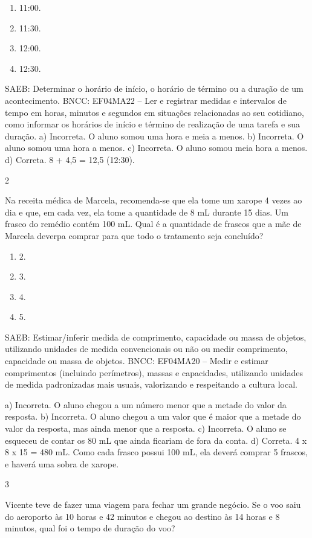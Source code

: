 \begin{mdframed}[linewidth=2pt,linecolor=salmao,roundcorner=2pt]
\begin{itemize}
{\begin{itemize}
\begin{escolha}
\begin{enumerate}
\item
  11:00.
\item
  11:30.
\item
  12:00.
\item
  12:30.
\end{enumerate}

SAEB: Determinar o horário de início, o horário de término ou a duração de um acontecimento.
BNCC: EF04MA22 -- Ler e registrar medidas e intervalos de tempo em horas, minutos e segundos em
situações relacionadas ao seu cotidiano, como informar os horários de início e término de realização
de uma tarefa e sua duração.
a) Incorreta. O aluno somou uma hora e meia a menos.
b) Incorreta. O aluno somou uma hora a menos.
c) Incorreta. O aluno somou meia hora a menos.
d) Correta. 8 + 4,5 = 12,5 (12:30).


\num{2}

Na receita médica de Marcela, recomenda-se que ela tome um xarope 4 vezes ao
dia e que, em cada vez, ela tome a quantidade de 8 mL durante 15 dias. Um
frasco do remédio contém 100 mL. Qual é a quantidade de
frascos que a mãe de Marcela deverpa comprar para que todo o tratamento
seja concluído?

\begin{enumerate}
\item
  2.
\item
  3.
\item
  4.
\item
  5.
\end{enumerate}

SAEB: Estimar/inferir medida de comprimento, capacidade ou massa de objetos, utilizando unidades de medida convencionais ou não ou medir comprimento, capacidade ou massa de objetos.
BNCC: EF04MA20 -- Medir e estimar comprimentos (incluindo perímetros), massas e capacidades, utilizando
unidades de medida padronizadas mais usuais, valorizando e respeitando a cultura local.

a) Incorreta. O aluno chegou a um número menor que a metade do valor da resposta.
b) Incorreta. O aluno chegou a um valor que é maior que a metade do valor da resposta, mas ainda menor que a resposta.
c) Incorreta. O aluno se esqueceu de contar os 80 mL que ainda ficariam de fora da conta.
d) Correta. 4 x 8 x 15 = 480 mL. Como cada frasco possui 100 mL, ela deverá
comprar 5 frascos, e haverá uma sobra de xarope.

\num{3}

Vicente teve de fazer uma viagem para fechar um grande negócio. Se o voo
saiu do aeroporto às 10 horas e 42 minutos e chegou ao destino às 14
horas e 8 minutos, qual foi o tempo de duração do voo?


\end{escolha}
\end{itemize}}
\end{itemize}
\end{mdframed}
